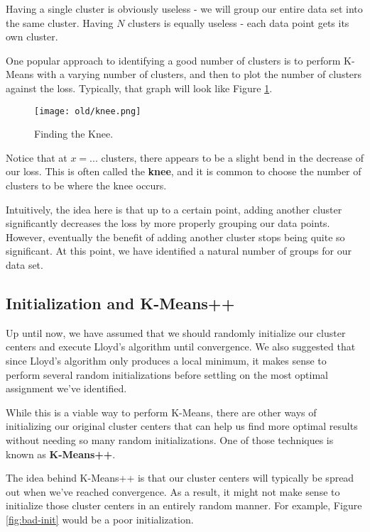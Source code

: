 Having a single cluster is obviously useless - we will group our entire data set into the same cluster. Having $N$ clusters is equally useless - each data point gets its own cluster.

One popular approach to identifying a good number of clusters is to perform K-Means with a varying number of clusters, and then to plot the number of clusters against the loss. Typically, that graph will look like Figure \ref{fig:knee}.

\begin{figure}
    \centering
    \texttt{[image: old/knee.png]}
    \caption{Finding the Knee.}
    \label{fig:knee}
\end{figure}

Notice that at $x=...$ clusters, there appears to be a slight bend in the decrease of our loss. This is often called the \textbf{knee}, and it is common to choose the number of clusters to be where the knee occurs.

Intuitively, the idea here is that up to a certain point, adding another cluster significantly decreases the loss by more properly grouping our data points. However, eventually the benefit of adding another cluster stops being quite so significant. At this point, we have identified a natural number of groups for our data set.

\subsection{Initialization and K-Means++}
Up until now, we have assumed that we should randomly initialize our cluster centers and execute Lloyd's algorithm until convergence. We also suggested that since Lloyd's algorithm only produces a local minimum, it makes sense to perform several random initializations before settling on the most optimal assignment we've identified.

While this is a viable way to perform K-Means, there are other ways of initializing our original cluster centers that can help us find more optimal results without needing so many random initializations. One of those techniques is known as \textbf{K-Means++}.

The idea behind K-Means++ is that our cluster centers will typically be spread out when we've reached convergence. As a result, it might not make sense to initialize those cluster centers in an entirely random manner. For example, Figure \ref{fig:bad-init} would be a poor initialization.

